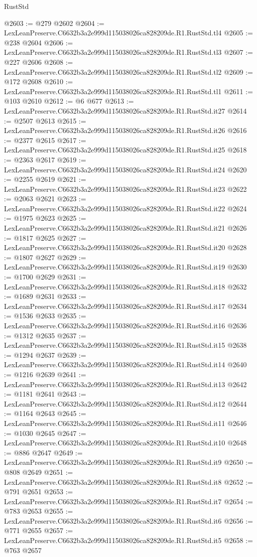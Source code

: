 \begin{lexlean}{RustStd}
\begin{coremodule}
@2603 := @279 @2602
@2604 := LexLeanPreserve.C6632b3a2e999d115038026ca828209de.R1.RustStd.tl4
@2605 := @238 @2604
@2606 := LexLeanPreserve.C6632b3a2e999d115038026ca828209de.R1.RustStd.tl3
@2607 := @227 @2606
@2608 := LexLeanPreserve.C6632b3a2e999d115038026ca828209de.R1.RustStd.tl2
@2609 := @172 @2608
@2610 := LexLeanPreserve.C6632b3a2e999d115038026ca828209de.R1.RustStd.tl1
@2611 := @103 @2610
@2612 := @6 @677
@2613 := LexLeanPreserve.C6632b3a2e999d115038026ca828209de.R1.RustStd.it27
@2614 := @2507 @2613
@2615 := LexLeanPreserve.C6632b3a2e999d115038026ca828209de.R1.RustStd.it26
@2616 := @2377 @2615
@2617 := LexLeanPreserve.C6632b3a2e999d115038026ca828209de.R1.RustStd.it25
@2618 := @2363 @2617
@2619 := LexLeanPreserve.C6632b3a2e999d115038026ca828209de.R1.RustStd.it24
@2620 := @2255 @2619
@2621 := LexLeanPreserve.C6632b3a2e999d115038026ca828209de.R1.RustStd.it23
@2622 := @2063 @2621
@2623 := LexLeanPreserve.C6632b3a2e999d115038026ca828209de.R1.RustStd.it22
@2624 := @1975 @2623
@2625 := LexLeanPreserve.C6632b3a2e999d115038026ca828209de.R1.RustStd.it21
@2626 := @1817 @2625
@2627 := LexLeanPreserve.C6632b3a2e999d115038026ca828209de.R1.RustStd.it20
@2628 := @1807 @2627
@2629 := LexLeanPreserve.C6632b3a2e999d115038026ca828209de.R1.RustStd.it19
@2630 := @1700 @2629
@2631 := LexLeanPreserve.C6632b3a2e999d115038026ca828209de.R1.RustStd.it18
@2632 := @1689 @2631
@2633 := LexLeanPreserve.C6632b3a2e999d115038026ca828209de.R1.RustStd.it17
@2634 := @1536 @2633
@2635 := LexLeanPreserve.C6632b3a2e999d115038026ca828209de.R1.RustStd.it16
@2636 := @1312 @2635
@2637 := LexLeanPreserve.C6632b3a2e999d115038026ca828209de.R1.RustStd.it15
@2638 := @1294 @2637
@2639 := LexLeanPreserve.C6632b3a2e999d115038026ca828209de.R1.RustStd.it14
@2640 := @1216 @2639
@2641 := LexLeanPreserve.C6632b3a2e999d115038026ca828209de.R1.RustStd.it13
@2642 := @1181 @2641
@2643 := LexLeanPreserve.C6632b3a2e999d115038026ca828209de.R1.RustStd.it12
@2644 := @1164 @2643
@2645 := LexLeanPreserve.C6632b3a2e999d115038026ca828209de.R1.RustStd.it11
@2646 := @1030 @2645
@2647 := LexLeanPreserve.C6632b3a2e999d115038026ca828209de.R1.RustStd.it10
@2648 := @886 @2647
@2649 := LexLeanPreserve.C6632b3a2e999d115038026ca828209de.R1.RustStd.it9
@2650 := @808 @2649
@2651 := LexLeanPreserve.C6632b3a2e999d115038026ca828209de.R1.RustStd.it8
@2652 := @791 @2651
@2653 := LexLeanPreserve.C6632b3a2e999d115038026ca828209de.R1.RustStd.it7
@2654 := @783 @2653
@2655 := LexLeanPreserve.C6632b3a2e999d115038026ca828209de.R1.RustStd.it6
@2656 := @771 @2655
@2657 := LexLeanPreserve.C6632b3a2e999d115038026ca828209de.R1.RustStd.it5
@2658 := @763 @2657

\end{coremodule}
\end{lexlean}
